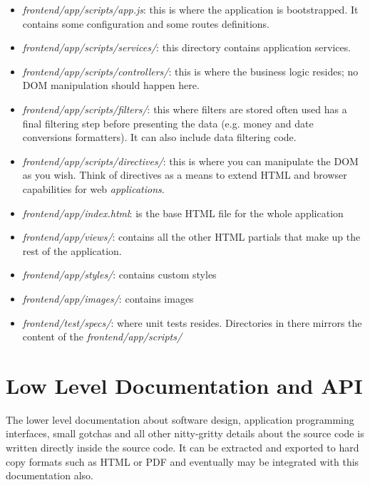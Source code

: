 \documentclass[letterpaper,10pt,english]{sphinxmanual}
\begin{document}
\begin{itemize}
\item {} 
\emph{frontend/app/scripts/app.js}: this is where the application is
bootstrapped. It contains some configuration and some routes
definitions.

\item {} 
\emph{frontend/app/scripts/services/}: this directory contains
application services.

\item {} 
\emph{frontend/app/scripts/controllers/}: this is where the business
logic resides; no DOM manipulation should happen here.

\item {} 
\emph{frontend/app/scripts/filters/}: this where filters are stored often
used has a final filtering step before presenting the data
(e.g. money and date conversions formatters). It can also include
data filtering code.

\item {} 
\emph{frontend/app/scripts/directives/}: this is where you can manipulate
the DOM as you wish. Think of directives as a means to extend HTML
and browser capabilities for web \emph{applications}.

\item {} 
\emph{frontend/app/index.html}: is the base HTML file for the whole
application

\item {} 
\emph{frontend/app/views/}: contains all the other HTML partials that
make up the rest of the application.

\item {} 
\emph{frontend/app/styles/}: contains custom styles

\item {} 
\emph{frontend/app/images/}: contains images

\item {} 
\emph{frontend/test/specs/}: where unit tests resides. Directories in there
mirrors the content of the \emph{frontend/app/scripts/}

\end{itemize}


\section{Low Level Documentation and API}
\label{developer-guide:low-level-documentation-and-api}
The lower level documentation about software design, application
programming interfaces, small gotchas and all other nitty-gritty
details about the source code is written directly inside the source
code. It can be extracted and exported to hard copy formats such as
HTML or PDF and eventually may be integrated with this documentation
also.
\end{document}
